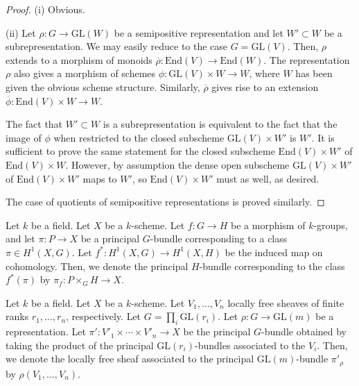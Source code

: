 \begin{proof}
\item[(i)] Obvious.
\item[(ii)] Let $\rho:G\to \mathrm{GL}(W)$ be a semipositive representation and let $W'\subset W$ be a subrepresentation. 
We may easily reduce to the case $G=\mathrm{GL}(V)$. 
Then, $\rho$ extends to a morphism of monoids $\overline{\rho}:\mathrm{End}(V)\to \mathrm{End}(W)$. 
The representation $\rho$ also gives a morphism of schemes $\phi:\mathrm{GL}(V)\times W\to W$, where $W$ has been given the obvious scheme structure. 
Similarly, $\overline{\rho}$ gives rise to an extension $\overline{\phi}:\mathrm{End}(V)\times W\to W$. 

The fact that $W'\subset W$ is a subrepresentation is equivalent to the fact that the image of $\phi$ when restricted to the closed subscheme $\mathrm{GL}(V)\times W'$ is $W'$. 
It is sufficient to prove the same statement for the closed subscheme $\mathrm{End}(V)\times W'$ of $\mathrm{End}(V)\times W$. 
However, by assumption the dense open subscheme $\mathrm{GL}(V)\times W'$ of $\mathrm{End}(V)\times W'$ maps to $W'$, so $\mathrm{End}(V)\times W'$ must as well, as desired.

The case of quotients of semipositive representations is proved similarly.
\end{proof}




\begin{definition}
Let $k$ be a field.
Let $X$ be a $k$-scheme.
Let $f:G\to H$ be a morphism of $k$-groups, and let $\pi:P\to X$ be a principal $G$-bundle corresponding to a class $\pi\in H^1(X,G)$. 
Let $f^{*}:H^1(X,G)\to H^1(X,H)$ be the induced map on cohomology. 
Then, we denote the principal $H$-bundle corresponding to the class $f^{*}(\pi)$ by $\pi_f:P\times_{G}H\to X$.
\end{definition}

\begin{definition}
Let $k$ be a field.
Let $X$ be a $k$-scheme. 
Let $V_1,\ldots,V_n$ locally free sheaves of finite ranks $r_1,\dots, r_n$, respectively.
Let $G=\prod_i \mathrm{GL}(r_i)$.
Let $\rho:G\rightarrow \mathrm{GL}(m)$ be a representation. 
Let $\pi':V'_1\times\cdots\times V'_n\to X$ be the principal $G$-bundle obtained by taking the product of the principal $\mathrm{GL}(r_i)$-bundles associated to the $V_i$.
Then, we denote the locally free sheaf associated to the principal $\mathrm{GL}(m)$-bundle $\pi'_{\rho}$ by $\rho(V_1,\dots, V_n)$.
\end{definition}





